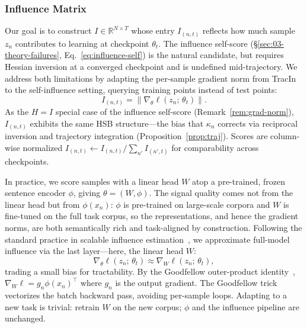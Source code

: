 \subsubsection{Influence Matrix} \label{sec:04-gradient-matrix}
\begin{foldable} %
  Our goal is to construct $I \in \mathbb{R}^{N \times T}$ whose entry $I_{(n,t)}$ reflects how much sample $z_n$ contributes to learning at checkpoint $\theta_t$.
  The influence self-score (\S\ref{sec:03-theory-failures}, Eq.~\ref{eq:influence-self}) is the natural candidate, but requires Hessian inversion at a converged checkpoint and is undefined mid-trajectory.
  We address both limitations by adapting the per-sample gradient norm from TracIn~\cite{pruthi2020estimating} to the self-influence setting, querying training points instead of test points:
  \begin{equation}
    I_{(n,t)} = \|\nabla_\theta \ell(z_n;\,\theta_t)\|.
    \label{eq:influence-matrix}
  \end{equation}
  As the $H=I$ special case of the influence self-score (Remark~\ref{rem:grad-norm}), $I_{(n,t)}$ exhibits the same HSB structure---the bias that $\kappa_n$ corrects via reciprocal inversion and trajectory integration (Proposition~\ref{prop:traj}).
  Scores are column-wise normalized $I_{(n,t)} \leftarrow I_{(n,t)} / \sum_{n'} I_{(n',t)}$ for comparability across checkpoints.
\end{foldable}

\begin{foldable}
  In practice, we score samples with a linear head $W$ atop a pre-trained, frozen sentence encoder $\phi$, giving $\theta = (W, \phi)$.
  The signal quality comes not from the linear head but from $\phi(x_n)$: $\phi$ is pre-trained on large-scale corpora and $W$ is fine-tuned on the full task corpus, so the representations, and hence the gradient norms, are both semantically rich and task-aligned by construction.
  Following the standard practice in scalable influence estimation~\cite{guo2021fastif}, we approximate full-model influence via the last layer---here, the linear head $W$:
  \begin{equation}
    \nabla_\theta \ell(z_n;\,\theta_t) \approx \nabla_W \ell(z_n;\,\theta_t),
    \label{eq:last-layer}
  \end{equation}
  trading a small bias for tractability.
  By the Goodfellow outer-product identity~\cite{goodfellow2015efficient}, $\nabla_W \ell = g_n \phi(x_n)^\top$ where $g_n$ is the output gradient.
  The Goodfellow trick vectorizes the batch backward pass, avoiding per-sample loops.
  Adapting to a new task is trivial: retrain $W$ on the new corpus; $\phi$ and the influence pipeline are unchanged.
\end{foldable}

